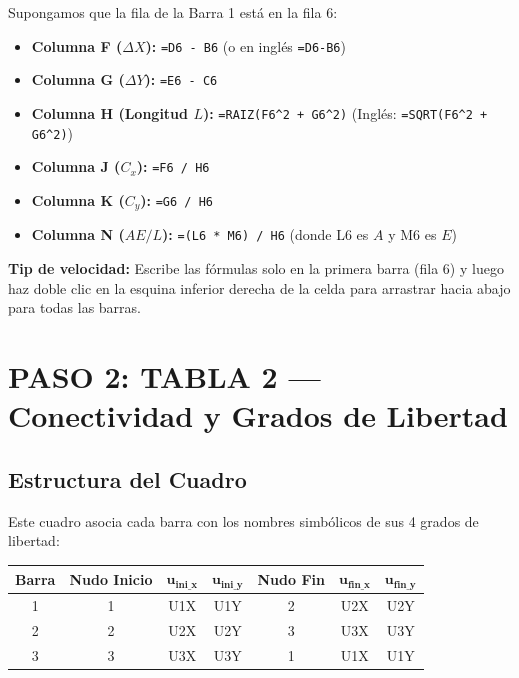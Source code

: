 \documentclass[10pt,a4paper]{article}
\begin{document}
\begin{excelbox}
Supongamos que la fila de la Barra 1 está en la fila 6:
\begin{itemize}
    \item \textbf{Columna F ($\Delta X$):} \texttt{=D6 - B6} \quad (o en inglés \texttt{=D6-B6})
    \item \textbf{Columna G ($\Delta Y$):} \texttt{=E6 - C6}
    \item \textbf{Columna H (Longitud $L$):} \texttt{=RAIZ(F6\textasciicircum 2 + G6\textasciicircum 2)} \quad (Inglés: \texttt{=SQRT(F6\textasciicircum 2 + G6\textasciicircum 2)})
    \item \textbf{Columna J ($C_x$):} \texttt{=F6 / H6}
    \item \textbf{Columna K ($C_y$):} \texttt{=G6 / H6}
    \item \textbf{Columna N ($AE/L$):} \texttt{=(L6 * M6) / H6} \quad (donde L6 es $A$ y M6 es $E$)
\end{itemize}
\textbf{Tip de velocidad:} Escribe las fórmulas solo en la primera barra (fila 6) y luego haz doble clic en la esquina inferior derecha de la celda para arrastrar hacia abajo para todas las barras.
\end{excelbox}

\section{PASO 2: TABLA 2 — Conectividad y Grados de Libertad}

\subsection{Estructura del Cuadro}
Este cuadro asocia cada barra con los nombres simbólicos de sus 4 grados de libertad:

\begin{center}
\small
\begin{tabular}{|c|c|c|c|c|c|c|}
\hline
\rowcolor{pastelYellow}
\textbf{Barra} & \textbf{Nudo Inicio} & $\mathbf{u_{ini\_x}}$ & $\mathbf{u_{ini\_y}}$ & \textbf{Nudo Fin} & $\mathbf{u_{fin\_x}}$ & $\mathbf{u_{fin\_y}}$ \\
\hline
1 & 1 & U1X & U1Y & 2 & U2X & U2Y \\
2 & 2 & U2X & U2Y & 3 & U3X & U3Y \\
3 & 3 & U3X & U3Y & 1 & U1X & U1Y \\
\hline
\end{tabular}
\end{center}
\end{document}
